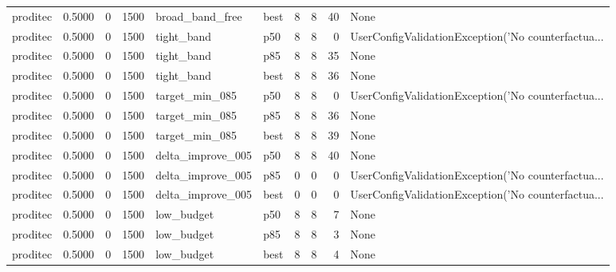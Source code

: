 \begin{tabular}{lrrrllrrrl}
proditec &    0.5000 &    0 &   1500 &      broad\_band\_free &   best &               8 &          8 &      40 &                                               None \\
proditec &    0.5000 &    0 &   1500 &           tight\_band &    p50 &               8 &          8 &       0 & UserConfigValidationException('No counterfactua... \\
proditec &    0.5000 &    0 &   1500 &           tight\_band &    p85 &               8 &          8 &      35 &                                               None \\
proditec &    0.5000 &    0 &   1500 &           tight\_band &   best &               8 &          8 &      36 &                                               None \\
proditec &    0.5000 &    0 &   1500 &       target\_min\_085 &    p50 &               8 &          8 &       0 & UserConfigValidationException('No counterfactua... \\
proditec &    0.5000 &    0 &   1500 &       target\_min\_085 &    p85 &               8 &          8 &      36 &                                               None \\
proditec &    0.5000 &    0 &   1500 &       target\_min\_085 &   best &               8 &          8 &      39 &                                               None \\
proditec &    0.5000 &    0 &   1500 &    delta\_improve\_005 &    p50 &               8 &          8 &      40 &                                               None \\
proditec &    0.5000 &    0 &   1500 &    delta\_improve\_005 &    p85 &               0 &          0 &       0 & UserConfigValidationException('No counterfactua... \\
proditec &    0.5000 &    0 &   1500 &    delta\_improve\_005 &   best &               0 &          0 &       0 & UserConfigValidationException('No counterfactua... \\
proditec &    0.5000 &    0 &   1500 &           low\_budget &    p50 &               8 &          8 &       7 &                                               None \\
proditec &    0.5000 &    0 &   1500 &           low\_budget &    p85 &               8 &          8 &       3 &                                               None \\
proditec &    0.5000 &    0 &   1500 &           low\_budget &   best &               8 &          8 &       4 &                                               None \\

\end{tabular}
